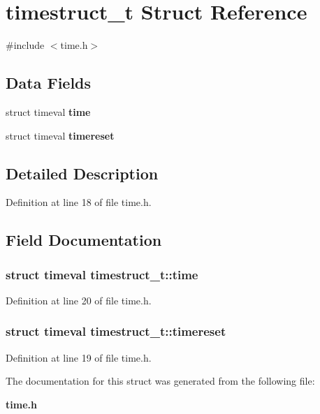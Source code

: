 \section{timestruct\_\-t Struct Reference}
\label{structtimestruct__t}


{\ttfamily \#include $<$time.h$>$}\subsection*{Data Fields}
\begin{DoxyCompactItemize}
\item 
struct timeval {\bf time}
\item 
struct timeval {\bf timereset}
\end{DoxyCompactItemize}


\subsection{Detailed Description}


Definition at line 18 of file time.h.

\subsection{Field Documentation}
\subsubsection[{time}]{\setlength{\rightskip}{0pt plus 5cm}struct timeval {\bf timestruct\_\-t::time}\hspace{0.3cm}{\ttfamily  [read]}}\label{structtimestruct__t_a75f2e4635e8b9dab3297eb6aeab0564a}


Definition at line 20 of file time.h.
\subsubsection[{timereset}]{\setlength{\rightskip}{0pt plus 5cm}struct timeval {\bf timestruct\_\-t::timereset}\hspace{0.3cm}{\ttfamily  [read]}}\label{structtimestruct__t_af12812cf92598070185a2f35de1171ef}


Definition at line 19 of file time.h.

The documentation for this struct was generated from the following file:\begin{DoxyCompactItemize}
\item 
{\bf time.h}\end{DoxyCompactItemize}
